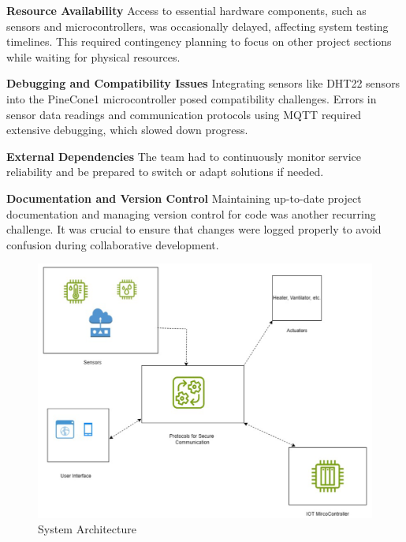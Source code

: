 \documentclass[USenglish,oneside,twocolumn]{article}
\begin{document}
\textbf{Resource Availability} Access to essential hardware components, such as sensors and microcontrollers, was occasionally delayed, affecting system testing timelines. This required contingency planning to focus on other project sections while waiting for physical resources.

\textbf{Debugging and Compatibility Issues} Integrating sensors like DHT22 sensors into the PineCone1 microcontroller posed compatibility challenges. Errors in sensor data readings and communication protocols using MQTT required extensive debugging, which slowed down progress.

\textbf{External Dependencies} The team had to continuously monitor service reliability and be prepared to switch or adapt solutions if needed.

\textbf{Documentation and Version Control} Maintaining up-to-date project documentation and managing version control for code was another recurring challenge. It was crucial to ensure that changes were logged properly to avoid confusion during collaborative development.

\begin{figure}[h] 
    \centering
    \includegraphics[width=\columnwidth]{images/AD.png}
    \caption{System Architecture}
    \label{fig:architecture}
\end{figure}
\end{document}
